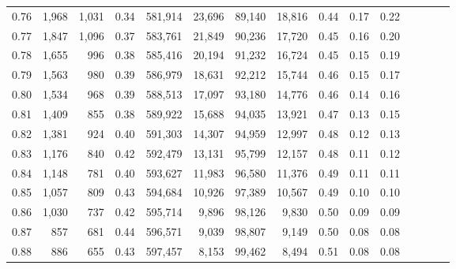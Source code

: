 \begin{tabular}{rrrcrrrrrrrrrrr}
0.76 &   1,968 &  1,031 &                                       0.34 &  581,914 &   23,696 &   89,140 &   18,816 &  0.44 &  0.17 &                         0.22 \\
0.77 &   1,847 &  1,096 &                                       0.37 &  583,761 &   21,849 &   90,236 &   17,720 &  0.45 &  0.16 &                         0.20 \\
0.78 &   1,655 &    996 &                                       0.38 &  585,416 &   20,194 &   91,232 &   16,724 &  0.45 &  0.15 &                         0.19 \\
0.79 &   1,563 &    980 &                                       0.39 &  586,979 &   18,631 &   92,212 &   15,744 &  0.46 &  0.15 &                         0.17 \\
0.80 &   1,534 &    968 &                                       0.39 &  588,513 &   17,097 &   93,180 &   14,776 &  0.46 &  0.14 &                         0.16 \\
0.81 &   1,409 &    855 &                                       0.38 &  589,922 &   15,688 &   94,035 &   13,921 &  0.47 &  0.13 &                         0.15 \\
0.82 &   1,381 &    924 &                                       0.40 &  591,303 &   14,307 &   94,959 &   12,997 &  0.48 &  0.12 &                         0.13 \\
0.83 &   1,176 &    840 &                                       0.42 &  592,479 &   13,131 &   95,799 &   12,157 &  0.48 &  0.11 &                         0.12 \\
0.84 &   1,148 &    781 &                                       0.40 &  593,627 &   11,983 &   96,580 &   11,376 &  0.49 &  0.11 &                         0.11 \\
0.85 &   1,057 &    809 &                                       0.43 &  594,684 &   10,926 &   97,389 &   10,567 &  0.49 &  0.10 &                         0.10 \\
0.86 &   1,030 &    737 &                                       0.42 &  595,714 &    9,896 &   98,126 &    9,830 &  0.50 &  0.09 &                         0.09 \\
0.87 &     857 &    681 &                                       0.44 &  596,571 &    9,039 &   98,807 &    9,149 &  0.50 &  0.08 &                         0.08 \\
0.88 &     886 &    655 &                                       0.43 &  597,457 &    8,153 &   99,462 &    8,494 &  0.51 &  0.08 &                         0.08 \\

\end{tabular}
